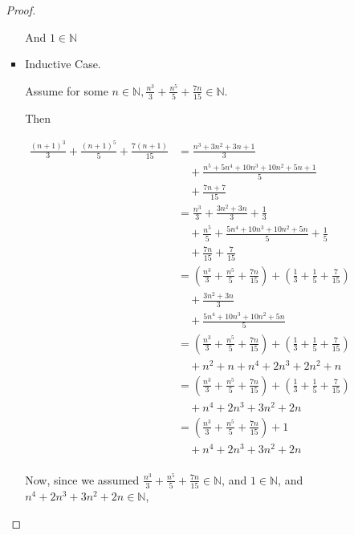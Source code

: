 \documentclass[12pt,letterpaper]{article}
\begin{document}
\begin{enumerate}
\begin{enumerate}
\begin{enumerate}
\begin{proof}
\begin{itemize}
                    And $1 \in \mathbb{N}$
                  \item Inductive Case.

                    Assume for some $n \in \mathbb{N}, \frac{n^3}{3} + \frac{n^5}{5} + \frac{7n}{15} \in \mathbb{N}$.

                    Then

                    \begin{align*}
                      \frac{\left(n + 1\right)^3}{3} + \frac{\left(n + 1\right)^5}{5} + \frac{7\left(n + 1\right)}{15}
                      &= \frac{n^3 + 3n^2 + 3n + 1}{3} \\
                      &\quad+ \frac{n^5 + 5n^4 + 10n^3 + 10n^2 + 5n + 1}{5} \\
                      &\quad+ \frac{7n + 7}{15} \\
                      &= \frac{n^3}{3} + \frac{3n^2 + 3n}{3} + \frac{1}{3} \\
                      &\quad+ \frac{n^5}{5} + \frac{5n^4 + 10n^3 + 10n^2 + 5n}{5} + \frac{1}{5} \\
                      &\quad+ \frac{7n}{15} + \frac{7}{15} \\
                      &= \left(\frac{n^3}{3} + \frac{n^5}{5} + \frac{7n}{15}\right) + \left(\frac{1}{3} + \frac{1}{5} + \frac{7}{15}\right) \\
                      &\quad+ \frac{3n^2 + 3n}{3} \\
                      &\quad+ \frac{5n^4 + 10n^3 + 10n^2 + 5n}{5} \\
                      &= \left(\frac{n^3}{3} + \frac{n^5}{5} + \frac{7n}{15}\right) + \left(\frac{1}{3} + \frac{1}{5} + \frac{7}{15}\right) \\
                      &\quad+ n^2 + n + n^4 + 2n^3 + 2n^2 + n \\
                      &= \left(\frac{n^3}{3} + \frac{n^5}{5} + \frac{7n}{15}\right) + \left(\frac{1}{3} + \frac{1}{5} + \frac{7}{15}\right) \\
                      &\quad+ n^4 + 2n^3 + 3n^2 + 2n \\
                      &= \left(\frac{n^3}{3} + \frac{n^5}{5} + \frac{7n}{15}\right) + 1 \\
                      &\quad+ n^4 + 2n^3 + 3n^2 + 2n \\
                    \end{align*}

                    Now, since we assumed $\frac{n^3}{3} + \frac{n^5}{5} + \frac{7n}{15} \in \mathbb{N}$,
                    and $1 \in \mathbb{N}$, and $n^4 + 2n^3 + 3n^2 + 2n \in \mathbb{N}$,


\end{itemize}
\end{proof}
\end{enumerate}
\end{enumerate}
\end{enumerate}
\end{document}
